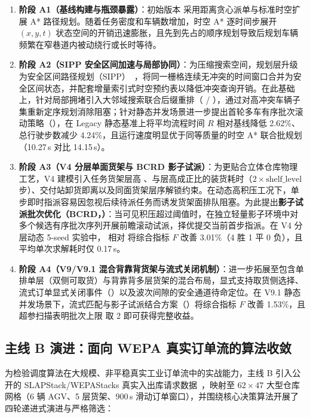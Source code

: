 \begin{enumerate}
  \item \textbf{阶段 A1（基线构建与瓶颈暴露）}：初始版本  采用距离贪心派单与标准时空扩展 A* 路径规划。随着任务密度和车辆数增加，时空 A* 逐时间步展开 $(x, y, t)$ 状态空间的开销迅速膨胀，且先到先占的顺序规划导致后规划车辆频繁在窄巷道内被动绕行或长时等待。
  \item \textbf{阶段 A2（SIPP 安全区间加速与局部协同）}：为压缩搜索空间，规划层升级为安全区间路径规划（SIPP）~\cite{phillips2011sipp}，将同一栅格连续无冲突的时间窗口合并为安全区间状态，并配套增量索引式时空预约表以降低冲突查询开销。在此基础上，针对局部拥堵引入大邻域搜索联合后缀重排（ / ），通过对高冲突车辆子集重新定序规划消除阻塞；针对静态并发场景进一步提出首轮多车有序批次滚动策略（），在 Legacy 静态基准上将平均流程时间 $R$ 相对基线降低 2.62\%、总行驶步数减少 4.24\%，且运行速度明显优于同等质量的时空 A* 联合批规划（10.27\,s 对比 14.15\,s）。
  \item \textbf{阶段 A3（V4 分层单面货架与 BCRD 影子试派）}：为更贴合立体仓库物理工艺，V4 建模引入任务货架层高 、与层高成正比的装货耗时（$2\times\text{shelf\_level}$ 步）、交付站卸货即离以及同面货架层序解锁约束。在动态高积压工况下，单步即时指派容易因忽视后续待派任务而诱发货架面排队阻塞。为此提出\textbf{影子试派批次优化（BCRD，）}：当可见积压超过阈值时，在独立轻量影子环境中对多个候选有序批次序列开展前瞻滚动试派，择优提交当前首步指派。在 V4 分层动态 5-seed 实验中， 相对  将综合指标 $F$ 改善 3.01\%（4 胜 1 平 0 负），且平均单次求解耗时仅 0.17\,s。
  \item \textbf{阶段 A4（V9/V9.1 混合背靠背货架与流式关闭机制）}：进一步拓展至包含单排单层（双侧可取货）与背靠背多层货架的混合布局，显式支持取货侧选择、流式订单显式关闭事件（）以及波次间隙的安全通道待命定位。在 V9.1 静态并发场景下，流式匹配与影子试派结合方案（）将综合指标 $F$ 改善 1.53\%，且超参扫描表明批次上限  取 2 即可获得完整收益。
\end{enumerate}

\subsection{主线 B 演进：面向 WEPA 真实订单流的算法收敛}

为检验调度算法在大规模、非平稳真实工业订单流中的实战能力，主线 B 引入公开的 SLAPStack/WEPAStacks 真实入出库请求数据~\cite{pfrommer2022slapstack}，映射至 $62\times 47$ 大型仓库网格（6 辆 AGV、5 层货架、900\,s 滑动订单窗口），并围绕核心决策算法开展了四轮递进式演进与严格筛选：

